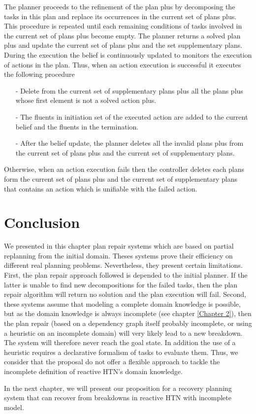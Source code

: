 The planner proceeds to the refinement of the plan plus by decomposing the tasks in this plan and replace its occurrences in the current set of plans plus. This procedure is repeated until each remaining conditions of tasks involved in the current set of plans plus become empty.  The planner returns a solved plan plus and update the current set of plans plus and the set supplementary plans.
During the execution the belief is continuously updated to monitors the execution of actions in the plan. 
Thus, when an action execution is successful it executes the following procedure 
\begin{itemize}
\item[-]	Delete from the current set of supplementary plans plus all the plans plus whose first element is not a solved action plus.
\item[-]	The fluents in initiation set of the executed action are added to the current belief and the fluents in the termination. 
\item[-]	After the belief update, the planner deletes all the invalid plans plus from the current set of plans plus and the current set of supplementary plans.
\end{itemize}
Otherwise, when an action execution fails then the controller deletes each plans form the current set of plans plus and the current set of supplementary plans that contains an action which is unifiable with the failed action.  

\section{Conclusion}
We presented in this chapter plan repair systems which are based on partial replanning from the initial domain. Theses systems prove their efficiency on different real planning problems. Nevertheless, they present certain limitations. First,  the plan repair approach followed  is depended to the initial planner. If the latter is unable to find new decompositions for the failed tasks, then the  plan repair algorithm will return no solution and the plan execution will fail.
 Second, these systems assume that modeling a complete domain knowledge is possible, but as the domain knowledge is always incomplete (see chapter \ref{Chapter 2}), then the plan repair (based on a dependency graph itself probably incomplete, or using a heuristic on an incomplete domain) will very likely lead to a new breakdown. The system will therefore never reach the goal state. In addition the use of a heuristic requires a declarative formalism of tasks to evaluate them. Thus, we consider that  the proposal  do not offer a flexible approach to tackle the incomplete definition of reactive HTN's domain knowledge. 
  
 In the next chapter, we will present our proposition for a recovery planning system that can recover from breakdowns in reactive HTN with incomplete model. 






 
